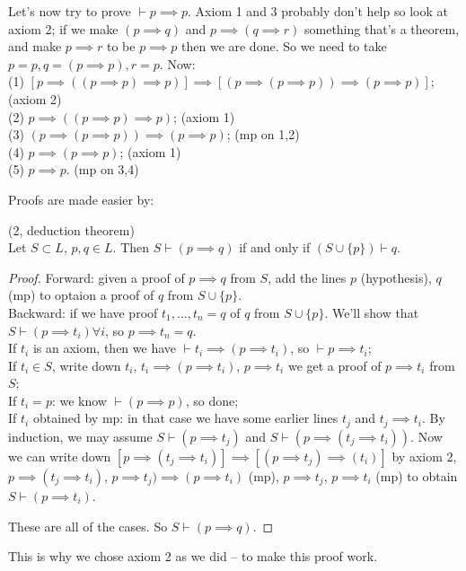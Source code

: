 \documentclass[a4paper]{article}
\begin{document}
\begin{eg}
Let's now try to prove $\vdash p \implies p$. Axiom 1 and 3 probably don't help so look at axiom 2; if we make $(p \implies q)$ and $p\implies (q \implies r)$ something that's a theorem, and make $p \implies r$ to be $p \implies p$ then we are done. So we need to take $p=p,q=(p \implies p), r=p$. Now:\\
(1) $[p \implies ((p \implies p) \implies p)] \implies [( p \implies (p \implies p)) \implies (p \implies p)]$; (axiom 2)\\
(2) $p \implies ((p \implies p) \implies p)$; (axiom 1)\\
(3) $(p \implies (p \implies p)) \implies (p \implies p)$; (mp on 1,2)\\
(4) $p \implies (p \implies p)$; (axiom 1)\\
(5) $p \implies p$. (mp on 3,4)
\end{eg}

Proofs are made easier by:
\begin{prop} (2, deduction theorem)\\
Let $S \subset L$, $p,q \in L$. Then $S \vdash (p \implies q)$ if and only if $(S \cup \{p\}) \vdash q$.
\begin{proof}
Forward: given a proof of $p \implies q$ from $S$, add the lines $p$ (hypothesis), $q$ (mp) to optaion a proof of $q$ from $S\cup\{p\}$.\\
Backward: if we have proof $t_1,...,t_n=q$ of $q$ from $S \cup \{p\}$. We'll show that $S \vdash (p \implies t_i) \forall i$, so $p \implies t_n=q$.\\
If $t_i$ is an axiom, then we have $\vdash t_i \implies (p \implies t_i)$, so $\vdash p \implies t_i$;\\
If $t_i \in S$, write down $t_i$, $t_i \implies (p \implies t_i)$, $p \implies t_i$ we get a proof of $p \implies t_i$ from $S$;\\
If $t_i = p$: we know $\vdash (p \implies p)$, so done;\\
If $t_i$ obtained by mp: in that case we have some earlier lines $t_j$ and $t_j \implies t_i$. By induction, we may assume $S \vdash (p \implies t_j)$ and $S \vdash (p \implies (t_j \implies t_i))$. Now we can write down $[p \implies (t_j \implies t_i)] \implies [(p \implies t_j) \implies (t_i)]$ by axiom 2, $p \implies (t_j \implies t_i)$, $p \implies t_j) \implies (p \implies t_i)$ (mp), $p \implies t_j$, $p \implies t_i$ (mp) to obtain $S \vdash (p \implies t_i)$.

These are all of the cases. So $S \vdash (p \implies q)$.
\end{proof}
This is why we chose axiom 2 as we did -- to make this proof work.
\end{prop}
\end{document}
